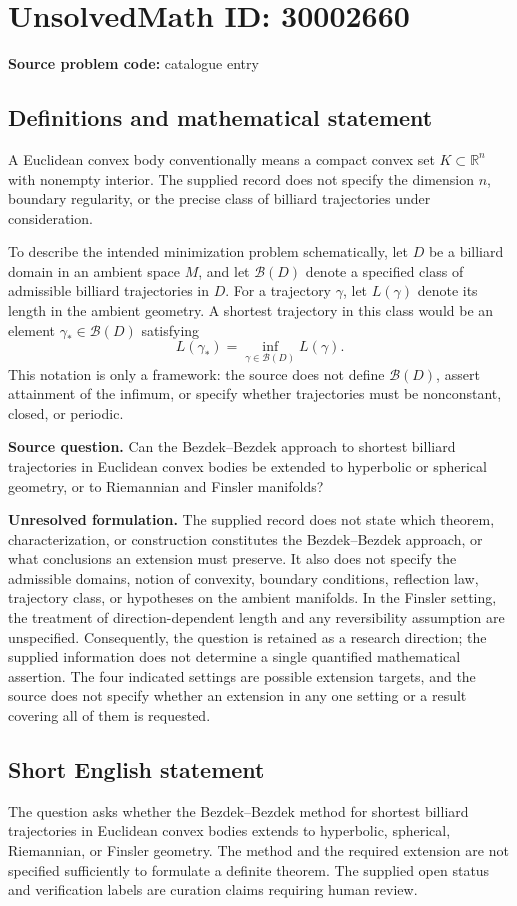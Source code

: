 \documentclass[11pt]{article}
\newcommand{\R}{\mathbb{R}}
\begin{document}
\section*{UnsolvedMath ID: 30002660}
\textbf{Source problem code:} catalogue entry
\subsection{Definitions and mathematical statement}
A Euclidean convex body conventionally means a compact convex set \(K\subset\R^n\) with nonempty interior. The supplied record does not specify the dimension \(n\), boundary regularity, or the precise class of billiard trajectories under consideration.

To describe the intended minimization problem schematically, let \(D\) be a billiard domain in an ambient space \(M\), and let \(\mathcal B(D)\) denote a specified class of admissible billiard trajectories in \(D\). For a trajectory \(\gamma\), let \(L(\gamma)\) denote its length in the ambient geometry. A shortest trajectory in this class would be an element \(\gamma_*\in\mathcal B(D)\) satisfying
\[
L(\gamma_*)=\inf_{\gamma\in\mathcal B(D)}L(\gamma).
\]
This notation is only a framework: the source does not define \(\mathcal B(D)\), assert attainment of the infimum, or specify whether trajectories must be nonconstant, closed, or periodic.

\textbf{Source question.} Can the Bezdek--Bezdek approach to shortest billiard trajectories in Euclidean convex bodies be extended to hyperbolic or spherical geometry, or to Riemannian and Finsler manifolds?

\textbf{Unresolved formulation.} The supplied record does not state which theorem, characterization, or construction constitutes the Bezdek--Bezdek approach, or what conclusions an extension must preserve. It also does not specify the admissible domains, notion of convexity, boundary conditions, reflection law, trajectory class, or hypotheses on the ambient manifolds. In the Finsler setting, the treatment of direction-dependent length and any reversibility assumption are unspecified. Consequently, the question is retained as a research direction; the supplied information does not determine a single quantified mathematical assertion. The four indicated settings are possible extension targets, and the source does not specify whether an extension in any one setting or a result covering all of them is requested.
\subsection{Short English statement}
The question asks whether the Bezdek--Bezdek method for shortest billiard trajectories in Euclidean convex bodies extends to hyperbolic, spherical, Riemannian, or Finsler geometry. The method and the required extension are not specified sufficiently to formulate a definite theorem. The supplied open status and verification labels are curation claims requiring human review.
\end{document}
